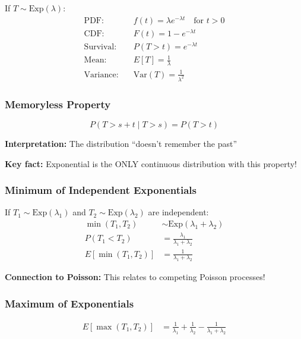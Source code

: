 \documentclass[11pt,letterpaper]{article}
\begin{document}
If $T \sim \text{Exp}(\lambda)$:
\begin{align*}
\text{PDF:} \quad & f(t) = \lambda e^{-\lambda t} \quad \text{for } t > 0 \\
\text{CDF:} \quad & F(t) = 1 - e^{-\lambda t} \\
\text{Survival:} \quad & P(T > t) = e^{-\lambda t} \\
\text{Mean:} \quad & E[T] = \frac{1}{\lambda} \\
\text{Variance:} \quad & \text{Var}(T) = \frac{1}{\lambda^2}
\end{align*}

\subsubsection{Memoryless Property}

\begin{tcolorbox}[colback=yellow!10,colframe=orange!80,title=Memoryless Property - KEY!]
\[
P(T > s + t \mid T > s) = P(T > t)
\]

\textbf{Interpretation:} The distribution ``doesn't remember the past''

\textbf{Key fact:} Exponential is the ONLY continuous distribution with this property!
\end{tcolorbox}

\subsubsection{Minimum of Independent Exponentials}

If $T_1 \sim \text{Exp}(\lambda_1)$ and $T_2 \sim \text{Exp}(\lambda_2)$ are independent:
\begin{align*}
\min(T_1, T_2) &\sim \text{Exp}(\lambda_1 + \lambda_2) \\
P(T_1 < T_2) &= \frac{\lambda_1}{\lambda_1 + \lambda_2} \\
E[\min(T_1, T_2)] &= \frac{1}{\lambda_1 + \lambda_2}
\end{align*}

\textbf{Connection to Poisson:} This relates to competing Poisson processes!

\subsubsection{Maximum of Exponentials}

\begin{align*}
E[\max(T_1, T_2)] &= \frac{1}{\lambda_1} + \frac{1}{\lambda_2} - \frac{1}{\lambda_1 + \lambda_2}
\end{align*}
\end{document}
